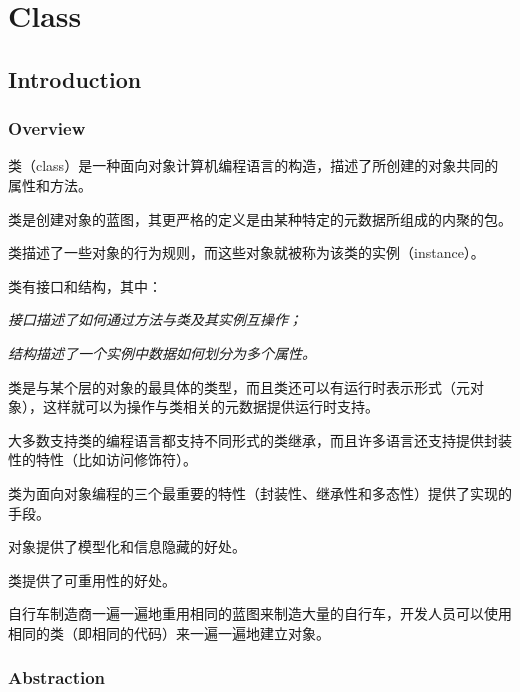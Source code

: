 \part{Class}

\chapter{Introduction}

\section{Overview}

类（class）是一种面向对象计算机编程语言的构造，描述了所创建的对象共同的属性和方法。

类是创建对象的蓝图，其更严格的定义是由某种特定的元数据所组成的内聚的包。

类描述了一些对象的行为规则，而这些对象就被称为该类的实例（instance）。

类有接口和结构，其中：



\begin{compactitem}
\item \textsl{接口描述了如何通过方法与类及其实例互操作；}
\item \textsl{结构描述了一个实例中数据如何划分为多个属性。}
\end{compactitem}



类是与某个层的对象的最具体的类型，而且类还可以有运行时表示形式（元对象），这样就可以为操作与类相关的元数据提供运行时支持。


大多数支持类的编程语言都支持不同形式的类继承，而且许多语言还支持提供封装性的特性（比如访问修饰符）。

类为面向对象编程的三个最重要的特性（封装性、继承性和多态性）提供了实现的手段。

\begin{compactitem}
\item 对象提供了模型化和信息隐藏的好处。
\item 类提供了可重用性的好处。
\end{compactitem}

自行车制造商一遍一遍地重用相同的蓝图来制造大量的自行车，开发人员可以使用相同的类（即相同的代码）来一遍一遍地建立对象。



\section{Abstraction}



